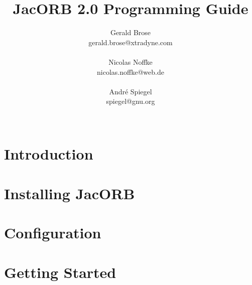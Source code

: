 \documentclass[12pt]{scrbook}
\title{JacORB 2.0 Programming Guide}
\author{Gerald Brose\\
\small{gerald.brose@xtradyne.com}\\
\\
Nicolas Noffke\\
\small{nicolas.noffke@web.de}\\
\\
Andr\'e Spiegel\\
\small{spiegel@gnu.org}\\
\\
$$
}
\begin{document}
\newcommand{\cmdline}[1]{\begin{small}\noindent \texttt{\$ #1}\end{small}}

\newcommand{\JacORBDir}{JacORB2\_0}
\newcommand{\JacORBVersion}{2.0}
\maketitle


\setlength{\parskip}{1.1ex}
\newpage
\tableofcontents


\chapter{Introduction}
\label{ch:intro}




\chapter{Installing JacORB}
\label{ch:installing}




\chapter{Configuration}
\label{ch:configuration}




\chapter{Getting Started}
\label{ch:start}



\end{document}
